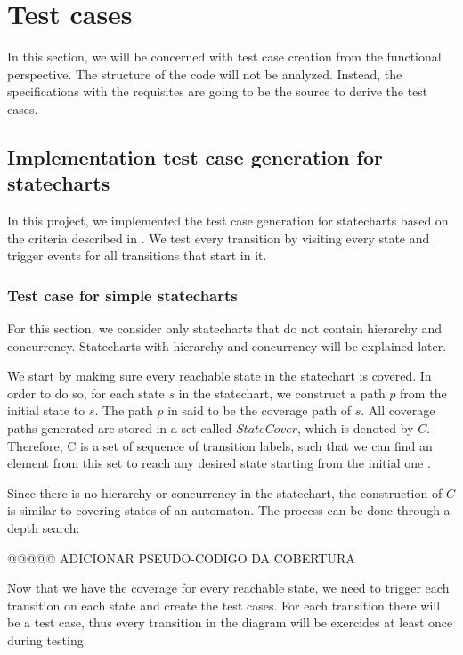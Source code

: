 \chapter{Test cases}
\label{cap:testgen}

In this section, we will be concerned with test case creation from the functional perspective. The structure of the code will not be analyzed. Instead, the specifications with the requisites are going to be the source to derive the test cases.





\section{Implementation test case generation for statecharts}

In this project, we implemented the test case generation for statecharts based on the criteria described in \cite{bogdanov}. We test every transition by visiting every state and trigger events for all transitions that start in it. 

\subsection{Test case for simple statecharts}

For this section, we consider only statecharts that do not contain hierarchy and concurrency. Statecharts with hierarchy and concurrency will be explained later.


We start by making sure every reachable state in the statechart is covered. In order to do so, for each state $s$ in the statechart, we construct a path $p$ from the initial state to $s$. The path $p$ in said to be the coverage path of $s$. All coverage paths generated are stored in a set called $State Cover$, which is denoted by $C$. Therefore, C is a set of sequence of transition labels, such that we can find an element from this set to reach any desired state starting from the initial one \cite{bogdanov}.

Since there is no hierarchy or concurrency in the statechart, the construction of $C$ is similar to covering states of an automaton. The process can be done through a depth search:

@@@@@ ADICIONAR PSEUDO-CODIGO DA COBERTURA

Now that we have the coverage for every reachable state, we need to trigger each transition on each state and create the test cases. For each transition there will be a test case, thus every transition in the diagram will be exercides at least once during testing.

